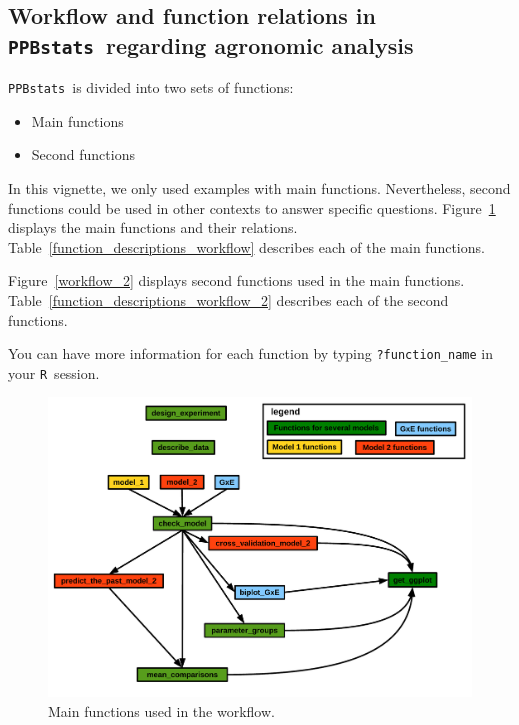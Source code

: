 \documentclass{book}\usepackage[]{graphicx}\usepackage[]{color}
\newcommand{\pack}{\texttt{PPBstats}}
\newcommand{\R}{\texttt{R}}
\begin{document}
\subsection{Workflow and function relations in \pack~regarding agronomic analysis}

\pack~is divided into two sets of functions:

\begin{itemize}
\item Main functions
\item Second functions
\end{itemize}

In this vignette, we only used examples with main functions.
Nevertheless, second functions could be used in other contexts to answer specific questions.
Figure~\ref{main_workflow} displays the main functions and their relations.
Table~\ref{function_descriptions_workflow} describes each of the main functions.

Figure~\ref{workflow_2} displays second functions used in the main functions.
Table~\ref{function_descriptions_workflow_2} describes each of the second functions.

You can have more information for each function by typing \texttt{?function\_name} in your \R~session.



\begin{figure}[H]
\begin{center}
\includegraphics[width=\textwidth,page=1]{PBBstats_function_relations}
\end{center}
\caption{Main functions used in the workflow.}
\label{main_workflow}
\end{figure}
\end{document}

